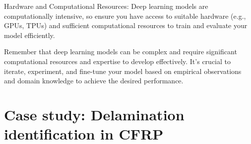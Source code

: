 \documentclass[10pt,aspectratio=169,dvipsnames]{beamer} %
\begin{document}
{		
		Hardware and Computational Resources: Deep learning models are computationally intensive, so ensure you have access to suitable hardware (e.g., GPUs, TPUs) and sufficient computational resources to train and evaluate your model efficiently.
		
		
		Remember that deep learning models can be complex and require significant computational resources and expertise to develop effectively. It's crucial to iterate, experiment, and fine-tune your model based on empirical observations and domain knowledge to achieve the desired performance.}
	\setcounter{subfigure}{0}
	\section{Case study: Delamination identification in CFRP}
\end{document}
